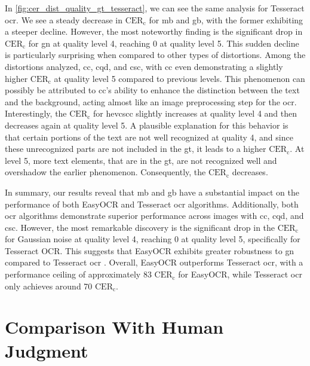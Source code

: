 In \autoref{fig:cer_dist_quality_gt_tesseract}, we can see the same analysis for Tesseract \gls{ocr}.
We see a steady decrease in $\text{CER}_{\text{c}}$ for \gls{mb} and \gls{gb}, with the former exhibiting a steeper decline.
However, the most noteworthy finding is the significant drop in $\text{CER}_{\text{c}}$ for \gls{gn} at quality level 4, reaching 0 at quality level 5.
This sudden decline is particularly surprising when compared to other types of distortions.
Among the distortions analyzed, \gls{cc}, \gls{cqd}, and \gls{csc}, with \gls{cc} even demonstrating a slightly higher $\text{CER}_{\text{c}}$ at quality level 5 compared to previous levels.
This phenomenon can possibly be attributed to \gls{cc}'s ability to enhance the distinction between the text and the background, acting almost like an image preprocessing step for the \gls{ocr}.
Interestingly, the $\text{CER}_{\text{c}}$ for \gls{hevcscc} slightly increases at quality level 4 and then decreases again at quality level 5.
A plausible explanation for this behavior is that certain portions of the text are not well recognized at quality 4, and since these unrecognized parts are not included in the \gls{gt}, it leads to a higher $\text{CER}_{\text{c}}$.
At level 5, more text elements, that are in the \gls{gt}, are not recognized well and overshadow the earlier phenomenon.
Consequently, the $\text{CER}_{\text{c}}$ decreases.

In summary, our results reveal that \gls{mb} and \gls{gb} have a substantial impact on the performance of both EasyOCR and Tesseract \gls{ocr} algorithms.
Additionally, both \gls{ocr} algorithms demonstrate superior performance across images with \gls{cc}, \gls{cqd}, and \gls{csc}.
However, the most remarkable discovery is the significant drop in the $\text{CER}_{\text{c}}$ for Gaussian noise at quality level 4, reaching 0 at quality level 5, specifically for Tesseract OCR.
This suggests that EasyOCR exhibits greater robustness to \gls{gn} compared to Tesseract \gls{ocr} .
Overall, EasyOCR outperforms Tesseract \gls{ocr}, with a performance ceiling of approximately 83 $\text{CER}_{\text{c}}$ for EasyOCR, while Tesseract \gls{ocr} only achieves around 70 $\text{CER}_{\text{c}}$.




\section{Comparison With Human Judgment}
\label{sec:comparison_with_human_judgment}

